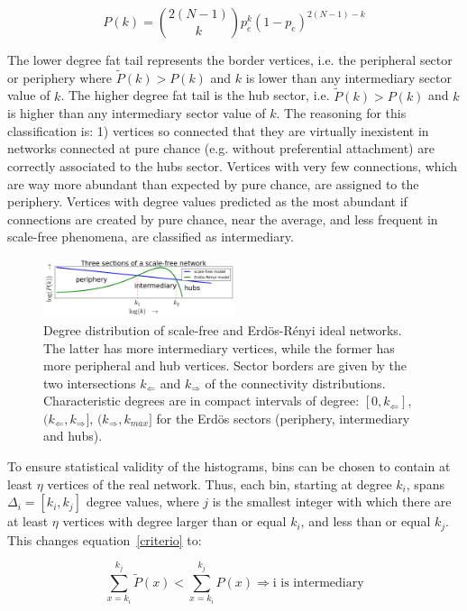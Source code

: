 \documentclass[%
 aip,
 jmp,%
 amsmath,amssymb,
 reprint,%
]{revtex4-1}
\begin{document}
\begin{equation}
    P(k)=\binom{2(N-1)}{k}p_e^k(1-p_e)^{2(N-1)-k}
\end{equation}

The lower degree fat tail represents the border vertices, i.e. the peripheral sector or periphery where $\widetilde{P}(k)>P(k)$ and $k$ is lower than any intermediary sector value of $k$. The higher degree fat tail is the hub sector, i.e. $\widetilde{P}(k)>P(k)$ and $k$ is higher than any intermediary sector value of $k$. The reasoning for this classification is: 1) vertices so connected that they are virtually inexistent in networks connected at pure chance (e.g. without preferential attachment) are correctly associated to the hubs sector. Vertices with very few connections, which are way more abundant than expected by pure chance, are assigned to the periphery. Vertices with degree values predicted as the most abundant if connections are created by pure chance, near the average, and less frequent in scale-free phenomena, are classified as intermediary.

\begin{figure}[!h]
    \centering
    \includegraphics[width=0.5\textwidth]{figs/fser_}
    \caption{Degree distribution of scale-free and Erd\"os-R\'enyi ideal networks. The latter has more
        intermediary vertices, while the former has more peripheral and hub vertices. Sector borders are
        given by the two intersections $k_\Leftarrow$ and $k_\Rightarrow$ of the connectivity distributions. Characteristic degrees
    are in compact intervals of degree: $[0,k_\Leftarrow]$, $(k_\Leftarrow,k_\Rightarrow]$, $(k_\Rightarrow,k_{max}]$ for the Erd\"os sectors (periphery, intermediary and hubs).}
    \label{fig:setores}
\end{figure}

To ensure statistical validity of the histograms, bins can be chosen to contain at least $\eta$ vertices of the real network. Thus, each bin, starting at degree $k_i$, spans $\Delta_i=[k_{i},k_{j}]$ degree values, where $j$ is the smallest integer with which there are at least $\eta$ vertices with degree larger than or equal $k_i$, and less than or equal $k_{j}$. This changes equation~\ref{criterio} to:

\begin{equation}\label{criterio2}
    \sum_{x=k_i}^{k_j} \widetilde{P}(x) < \sum_{x=k_i}^{k_j} P(x) \Rightarrow \text{i is intermediary}
\end{equation}
\end{document}
